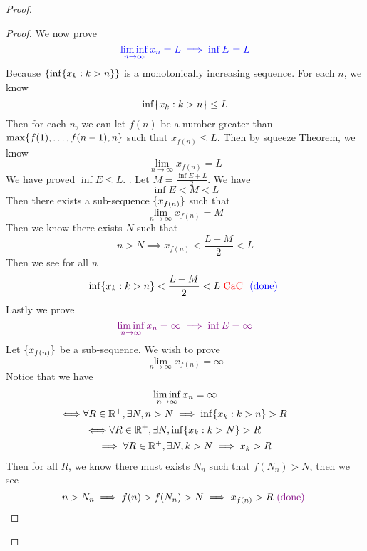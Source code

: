 \documentclass{report}
\begin{document}
\begin{proof}
\begin{proof}
We now prove 
\begin{equation}
\textcolor{blue}{\liminf_{n\to\infty} x_n=L \implies \inf E=L}
\end{equation}
Because $\{ \inf \{ x_k:k>n \} \}$ is a monotonically increasing sequence. For each $n$, we know
\begin{equation}
\inf \{ x_k:k>n \}\leq L
\end{equation}
Then for each $n$, we can let  $f(n)$ be a number greater than $\max \{ f(1),\dots ,f(n-1),n \}$ such that $x_{f(n)}\leq L$. Then by squeeze Theorem, we know 
\begin{equation}
\lim_{n\to\infty}x_{f(n)}=L
\end{equation}
We have proved $\inf E\leq L$. . Let $M=\frac{\inf E+L}{2}$. We have
\begin{equation}
\inf E<M<L
\end{equation}
Then there exists a sub-sequence $\{ x_{f(n)} \}$ such that
\begin{equation}
\lim_{n\to\infty}x_{f(n)}=M
\end{equation}
Then we know there exists $N$ such that
 \begin{equation}
n>N\implies x_{f(n)}<\frac{L+M}{2}<L
\end{equation}
Then we see for all $n$
\begin{equation}
\inf \{ x_k:k>n \}<\frac{L+M}{2}<L\text{ \textcolor{red}{CaC} }\textcolor{blue}{\text{ (done) }}
\end{equation}
Lastly we prove 
\begin{equation}
  \textcolor{violet}{\liminf_{n\to\infty} x_n=\infty\implies \inf E=\infty}
\end{equation}
Let $\{ x_{f(n)} \}$ be a sub-sequence. We wish to prove
\begin{equation}
\lim_{n\to\infty} x_{f(n)}=\infty
\end{equation}
Notice that we have
\begin{gather}
\liminf_{n\to\infty} x_n=\infty\\
\liff \forall R\inr^+ ,\exists N, n>N\implies \inf \set{x_k:k>n}>R\\
\liff  \forall R\inr^+,\exists N, \inf \set{x_k:k>N}>R\\
\implies  \forall R\inr^+,\exists N, k>N\implies x_k>R
\end{gather}
Then for all $R$, we know there must exists  $N_n$ such that  $f(N_n)>N$, then we see 
\begin{equation}
n>N_n\implies f(n)>f(N_n)>N\implies x_{f(n)}>R \textcolor{violet}{\text{ (done) }}
\end{equation}
\end{proof}

\end{proof}
\end{document}
